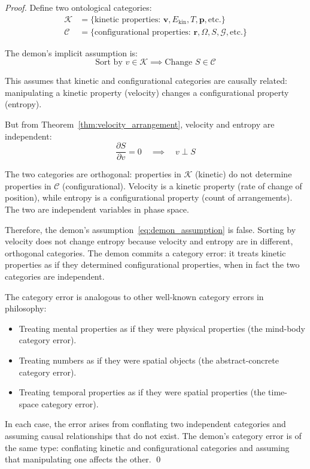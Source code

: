 \documentclass[12pt,a4paper]{article}
\theoremstyle{definition}
\theoremstyle{remark}
\newcommand{\phaselockgraph}{\mathcal{G}}
\begin{document}
\begin{proof}
Define two ontological categories:
\begin{align}
\mathcal{K} &= \{\text{kinetic properties: } \mathbf{v}, E_{\text{kin}}, T, \mathbf{p}, \text{etc.}\} \label{eq:category_kinetic} \\
\mathcal{C} &= \{\text{configurational properties: } \mathbf{r}, \Omega, S, \phaselockgraph, \text{etc.}\} \label{eq:category_configurational}
\end{align}

The demon's implicit assumption is:
\begin{equation}
\text{Sort by } v \in \mathcal{K} \implies \text{Change } S \in \mathcal{C}
\label{eq:demon_assumption}
\end{equation}

This assumes that kinetic and configurational categories are causally related: manipulating a kinetic property (velocity) changes a configurational property (entropy).

But from Theorem~\ref{thm:velocity_arrangement}, velocity and entropy are independent:
\begin{equation}
\frac{\partial S}{\partial v} = 0 \quad \implies \quad v \perp S
\end{equation}

The two categories are orthogonal: properties in $\mathcal{K}$ (kinetic) do not determine properties in $\mathcal{C}$ (configurational). Velocity is a kinetic property (rate of change of position), while entropy is a configurational property (count of arrangements). The two are independent variables in phase space.

Therefore, the demon's assumption~\eqref{eq:demon_assumption} is false. Sorting by velocity does not change entropy because velocity and entropy are in different, orthogonal categories. The demon commits a category error: it treats kinetic properties as if they determined configurational properties, when in fact the two categories are independent.

The category error is analogous to other well-known category errors in philosophy:
\begin{itemize}
    \item Treating mental properties as if they were physical properties (the mind-body category error).
    \item Treating numbers as if they were spatial objects (the abstract-concrete category error).
    \item Treating temporal properties as if they were spatial properties (the time-space category error).
\end{itemize}

In each case, the error arises from conflating two independent categories and assuming causal relationships that do not exist. The demon's category error is of the same type: conflating kinetic and configurational categories and assuming that manipulating one affects the other. \qed
\end{proof}
\end{document}
